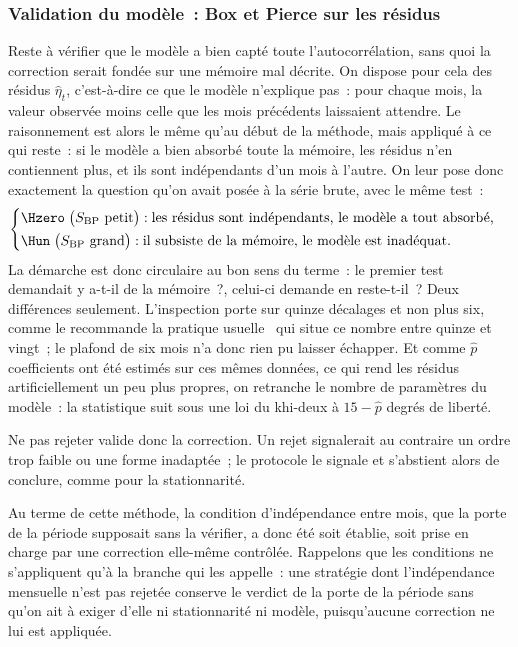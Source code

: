 \subsubsection*{Validation du modèle~: Box et Pierce sur les résidus}

Reste à vérifier que le modèle a bien capté toute l'autocorrélation, sans
quoi la correction serait fondée sur une mémoire mal décrite. On dispose pour
cela des résidus \(\hat\eta_t\), c'est-à-dire ce que le modèle
n'explique pas~: pour chaque mois, la valeur observée moins celle que les
mois précédents laissaient attendre. Le raisonnement est alors le même qu'au
début de la méthode, mais appliqué à ce qui reste~: si le modèle a bien
absorbé toute la mémoire, les résidus n'en contiennent plus, et ils sont
indépendants d'un mois à l'autre. On leur pose donc exactement la question
qu'on avait posée à la série brute, avec le même test~:
\[
  \begin{cases}
    \Hzero \;\bigl(S_{\mathrm{BP}} \text{ petit}\bigr) : \text{les résidus sont indépendants, le modèle a tout absorbé,}\\[2pt]
    \Hun \;\bigl(S_{\mathrm{BP}} \text{ grand}\bigr) : \text{il subsiste de la mémoire, le modèle est inadéquat.}
  \end{cases}
\]
La démarche est donc circulaire au bon sens du terme~: le premier test
demandait y a-t-il de la mémoire~?, celui-ci demande en
reste-t-il~? Deux différences seulement. L'inspection porte sur quinze
décalages et non plus six, comme le recommande la pratique
usuelle~\cite{boxpierce1970} qui situe ce nombre entre quinze et vingt~; le
plafond de six mois n'a donc rien pu laisser échapper. Et comme \(\hat p\)
coefficients ont été estimés sur ces mêmes données, ce qui rend les résidus
artificiellement un peu plus propres, on retranche le nombre de paramètres du
modèle~: la statistique suit sous \Hzero{} une loi du khi-deux à
\(15 - \hat p\) degrés de liberté.

Ne pas rejeter valide donc la correction. Un rejet signalerait au contraire
un ordre trop faible ou une forme inadaptée~; le protocole le signale et
s'abstient alors de conclure, comme pour la stationnarité.

Au terme de cette méthode, la condition d'indépendance entre mois, que la
porte de la période supposait sans la vérifier, a donc été soit établie, soit
prise en charge par une correction elle-même contrôlée. Rappelons que les
conditions ne s'appliquent qu'à la branche qui les appelle~: une stratégie
dont l'indépendance mensuelle n'est pas rejetée conserve le verdict de la
porte de la période sans qu'on ait à exiger d'elle ni stationnarité ni modèle,
puisqu'aucune correction ne lui est appliquée.

